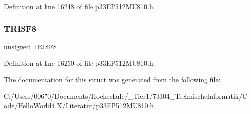 Definition at line 16248 of file p33\+E\+P512\+M\+U810.\+h.

\mbox{\label{structtag_t_r_i_s_f_b_i_t_s_a171ff069efd581df84fd1fe5eb987d41}} 
\subsubsection{\texorpdfstring{T\+R\+I\+S\+F8}{TRISF8}}
{\footnotesize\ttfamily unsigned T\+R\+I\+S\+F8}



Definition at line 16250 of file p33\+E\+P512\+M\+U810.\+h.



The documentation for this struct was generated from the following file\+:\begin{DoxyCompactItemize}
\item 
C\+:/\+Users/00670/\+Documents/\+Hochschule/\+\_\+\+Tier1/73304\+\_\+\+Technische\+Informatik/\+Code/\+Hello\+World4.\+X/\+Literatur/\hyperlink{p33_e_p512_m_u810_8h}{p33\+E\+P512\+M\+U810.\+h}\end{DoxyCompactItemize}
